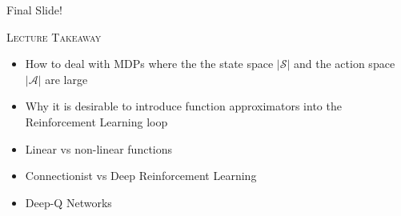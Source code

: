 \documentclass{beamer}
\newenvironment{takeaway}[1]{%
	\definecolor{shadecolor}{gray}{0.9}%
		\begin{shaded}{\color{skymagenta}\noindent\textsc{#1}}\\%
		}{%
		\end{shaded}%
}
\begin{document}
\begin{frame}{Final Slide!}
	\begin{takeaway}{Lecture Takeaway}
		\begin{itemize}
			\item How to deal with MDPs where the the state space $|\mathcal{S}|$ and the action space $|\mathcal{A}|$ are large
			\item Why it is desirable to introduce function approximators into the Reinforcement Learning loop
			\item Linear vs non-linear functions
			\item Connectionist vs Deep Reinforcement Learning
			\item Deep-Q Networks
		\end{itemize}
	\end{takeaway}
\end{frame}

\end{document}
